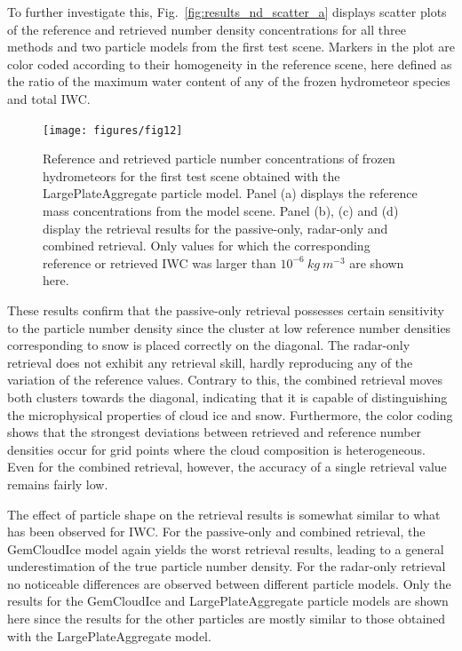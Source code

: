 \documentclass[journal abbreviation, manuscript]{copernicus}
\begin{document}
To further investigate this, Fig.~\ref{fig:results_nd_scatter_a} displays
scatter plots of the reference and retrieved number density concentrations for
all three methods and two particle models from the first test scene. Markers in
the plot are color coded according to their homogeneity in the reference scene,
here defined as the ratio of the maximum water content of any of the frozen
hydrometeor species and total IWC. 

\begin{figure}
\centering
\texttt{[image: figures/fig12]}
\caption{Reference and retrieved particle number concentrations of frozen
  hydrometeors for the first test scene obtained with the LargePlateAggregate
  particle model. Panel (a) displays the reference mass concentrations from the
  model scene. Panel (b), (c) and (d) display the retrieval results for the
  passive-only, radar-only and combined retrieval. Only values for which the corresponding
  reference or retrieved IWC was larger than  $10^{-6}\ \unit{kg\ m^{-3}}$ are shown here.}
\label{fig:results_nd_a}
\end{figure}

These results confirm that the passive-only retrieval possesses certain
sensitivity to the particle number density since the cluster at low reference
number densities corresponding to snow is placed correctly on the diagonal. The
radar-only retrieval does not exhibit any retrieval skill, hardly reproducing
any of the variation of the reference values. Contrary to this, the combined
retrieval moves both clusters towards the diagonal, indicating that it is
capable of distinguishing the microphysical properties of cloud ice and snow.
Furthermore, the color coding shows that the strongest deviations between
retrieved and reference number densities occur for grid points where the cloud
composition is heterogeneous. Even for the combined retrieval, however, the
accuracy of a single retrieval value remains fairly low.

The effect of particle shape on the retrieval results is somewhat similar to
what has been observed for IWC. For the passive-only and combined retrieval, the
GemCloudIce model again yields the worst retrieval results, leading to a general
underestimation of the true particle number density. For the radar-only
retrieval no noticeable differences are observed between different particle
models. Only the results for the GemCloudIce and LargePlateAggregate particle
models are shown here since the results for the other particles are mostly similar
to those obtained with the LargePlateAggregate model.
\end{document}
